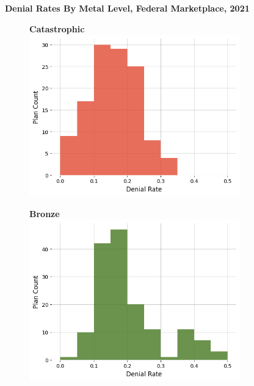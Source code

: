 \documentclass[12pt, a4paper,twoside]{report}
\theoremstyle{plain} %
\theoremstyle{definition} %
\theoremstyle{remark} %
\numberwithin{equation}{chapter}
\begin{document}
			\clearpage
			
			
			\begin{figure}
				\textbf{Denial Rates By Metal Level, Federal Marketplace, 2021}
				\vspace{3em}
				\centering
				\begin{subfigure}[t]{0.49\textwidth}
					\centering
					\textbf{Catastrophic}
					\includegraphics[width=\textwidth]{images/cms_puf/Catastrophic_dist.png}
				\end{subfigure}
				\hfill
				\begin{subfigure}[t]{0.49\textwidth}
					\centering
					\textbf{Bronze}
					\includegraphics[width=\textwidth]{images/cms_puf/Bronze_dist.png}

\end{subfigure}
\end{figure}
\end{document}
